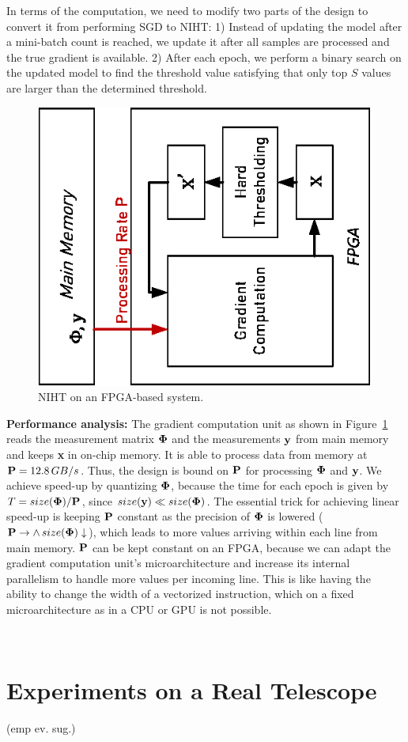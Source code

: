 \documentclass{article}
\begin{document}
In terms of the computation, we need to modify two parts of the design to convert it from performing SGD to NIHT: 1) Instead of updating the model after a mini-batch count is reached, we update it after all samples are processed and the true gradient is available. 2) After each epoch, we perform a binary search on the updated model to find the threshold value satisfying that only top $S$ values are larger than the determined threshold.

\begin{figure}
\centering
\includegraphics[width=0.5\columnwidth, angle=270]{figs/niht_fpga.eps}
\caption{NIHT on an FPGA-based system.}
\label{fig:fpga}
\end{figure}


{\bf Performance analysis:} The gradient computation unit as shown in Figure~\ref{fig:fpga} reads the measurement matrix ${\bf \Phi}$ and the measurements ${\bf y}$ from main memory and keeps {\bf x} in on-chip memory. It is able to process data from memory at ${\bf P}=12.8\,GB/s$. Thus, the design is bound on ${\bf P}$ for processing ${\bf \Phi}$ and ${\bf y}$. We achieve speed-up by quantizing ${\bf \Phi}$, because the time for each epoch is given by
$T = size({\bf \Phi})/{\bf P}$, since $size({\bf y}) \ll size({\bf \Phi})$. The essential trick for achieving linear speed-up is keeping ${\bf P}$ constant as the precision of ${\bf \Phi}$ is lowered (${\bf P}\to \land \, size({\bf \Phi})\downarrow$), which leads to more values arriving within each line from main memory. ${\bf P}$ can be kept constant on an FPGA, because we can adapt the gradient computation unit's microarchitecture and increase its internal parallelism to handle more values per incoming line. This is like having the ability to change the width of a vectorized instruction, which on a fixed microarchitecture as in a CPU or GPU is not possible.






\newpage
\
\newpage
\section{Experiments on a Real Telescope}
(emp ev. sug.)
\end{document}
